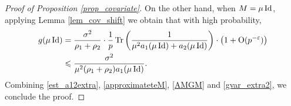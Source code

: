 \begin{proof}[Proof of Proposition \ref{prop_covariate}]
On the other hand, when $M=\mu \operatorname{Id}$, applying Lemma \ref{lem_cov_shift} we obtain that with high probability,
\begin{align}\label{gvar_extra2}
\begin{split}
g(\mu \operatorname{Id})&= \frac{\sigma^2}{\rho_1+\rho_2}\cdot \frac1p\operatorname{Tr}\left( \frac{1}{\mu^2 a_1 (\mu\operatorname{Id}) + a_2(\mu\operatorname{Id})}\right) \cdot \left(1 +\operatorname{O}(p^{-{\varepsilon}})\right)\\
&\leqslant \frac{\sigma^2}{\mu^2(\rho_1+\rho_2)a_1 (\mu\operatorname{Id})}.
\end{split}
\end{align}
Combining \eqref{est_a12extra}, \eqref{approximateteM}, \eqref{AMGM} and \eqref{gvar_extra2}, we conclude the proof.
\end{proof}

